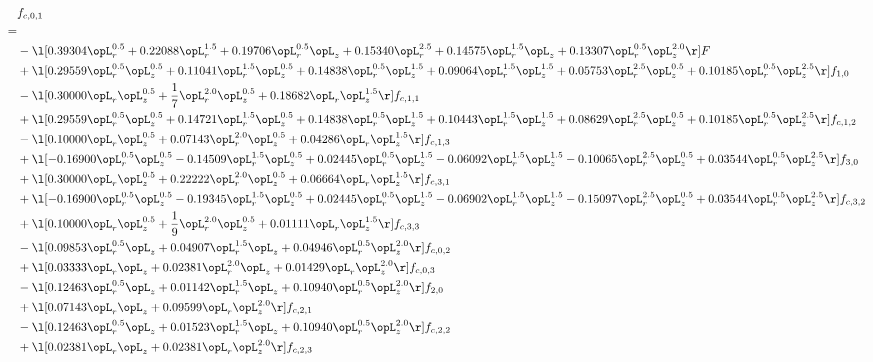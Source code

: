 \begin{alignat}{2} 
\label{eq:f_01_2} 
& f_{c,0,1} \nonumber \\ 
 = \\ 
& - \l[  0.39304 \opL_r^{0.5} +  0.22088 \opL_r^{1.5} +  0.19706 \opL_r^{0.5} \opL_z +  0.15340 \opL_r^{2.5} +  0.14575 \opL_r^{1.5} \opL_z +  0.13307 \opL_r^{0.5} \opL_z^{2.0}  \r] F \nonumber \\ 
& + \l[  0.29559 \opL_r^{0.5} \opL_z^{0.5} +  0.11041 \opL_r^{1.5} \opL_z^{0.5} +  0.14838 \opL_r^{0.5} \opL_z^{1.5} +  0.09064 \opL_r^{1.5} \opL_z^{1.5} +  0.05753 \opL_r^{2.5} \opL_z^{0.5} +  0.10185 \opL_r^{0.5} \opL_z^{2.5}  \r] f_{1,0} \nonumber \\ 
& - \l[  0.30000 \opL_r \opL_z^{0.5} + \frac{1}{7} \opL_r^{2.0} \opL_z^{0.5} +  0.18682 \opL_r \opL_z^{1.5}  \r] f_{c,1,1} \nonumber \\ 
& + \l[  0.29559 \opL_r^{0.5} \opL_z^{0.5} +  0.14721 \opL_r^{1.5} \opL_z^{0.5} +  0.14838 \opL_r^{0.5} \opL_z^{1.5} +  0.10443 \opL_r^{1.5} \opL_z^{1.5} +  0.08629 \opL_r^{2.5} \opL_z^{0.5} +  0.10185 \opL_r^{0.5} \opL_z^{2.5}  \r] f_{c,1,2} \nonumber \\ 
& - \l[  0.10000 \opL_r \opL_z^{0.5} +  0.07143 \opL_r^{2.0} \opL_z^{0.5} +  0.04286 \opL_r \opL_z^{1.5}  \r] f_{c,1,3} \nonumber \\ 
& + \l[  -0.16900 \opL_r^{0.5} \opL_z^{0.5}   -0.14509 \opL_r^{1.5} \opL_z^{0.5} +  0.02445 \opL_r^{0.5} \opL_z^{1.5}   -0.06092 \opL_r^{1.5} \opL_z^{1.5}   -0.10065 \opL_r^{2.5} \opL_z^{0.5} +  0.03544 \opL_r^{0.5} \opL_z^{2.5}  \r] f_{3,0} \nonumber \\ 
& + \l[  0.30000 \opL_r \opL_z^{0.5} +  0.22222 \opL_r^{2.0} \opL_z^{0.5} +  0.06664 \opL_r \opL_z^{1.5}  \r] f_{c,3,1} \nonumber \\ 
& + \l[  -0.16900 \opL_r^{0.5} \opL_z^{0.5}   -0.19345 \opL_r^{1.5} \opL_z^{0.5} +  0.02445 \opL_r^{0.5} \opL_z^{1.5}   -0.06902 \opL_r^{1.5} \opL_z^{1.5}   -0.15097 \opL_r^{2.5} \opL_z^{0.5} +  0.03544 \opL_r^{0.5} \opL_z^{2.5}  \r] f_{c,3,2} \nonumber \\ 
& + \l[  0.10000 \opL_r \opL_z^{0.5} + \frac{1}{9} \opL_r^{2.0} \opL_z^{0.5} +  0.01111 \opL_r \opL_z^{1.5}  \r] f_{c,3,3} \nonumber \\ 
& - \l[  0.09853 \opL_r^{0.5} \opL_z +  0.04907 \opL_r^{1.5} \opL_z +  0.04946 \opL_r^{0.5} \opL_z^{2.0}  \r] f_{c,0,2} \nonumber \\ 
& + \l[  0.03333 \opL_r \opL_z +  0.02381 \opL_r^{2.0} \opL_z +  0.01429 \opL_r \opL_z^{2.0}  \r] f_{c,0,3} \nonumber \\ 
& - \l[  0.12463 \opL_r^{0.5} \opL_z +  0.01142 \opL_r^{1.5} \opL_z +  0.10940 \opL_r^{0.5} \opL_z^{2.0}  \r] f_{2,0} \nonumber \\ 
& + \l[  0.07143 \opL_r \opL_z +  0.09599 \opL_r \opL_z^{2.0}  \r] f_{c,2,1} \nonumber \\ 
& - \l[  0.12463 \opL_r^{0.5} \opL_z +  0.01523 \opL_r^{1.5} \opL_z +  0.10940 \opL_r^{0.5} \opL_z^{2.0}  \r] f_{c,2,2} \nonumber \\ 
& + \l[  0.02381 \opL_r \opL_z +  0.02381 \opL_r \opL_z^{2.0}  \r] f_{c,2,3} \nonumber \\ 
\end{alignat} 


